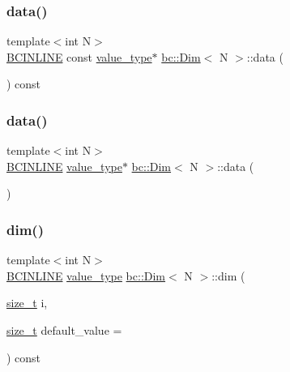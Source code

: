 \subsubsection{\texorpdfstring{data()}{data()}\hspace{0.1cm}{\footnotesize\ttfamily [1/2]}}
{\footnotesize\ttfamily template$<$int N$>$ \\
\hyperlink{common_8h_a6699e8b0449da5c0fafb878e59c1d4b1}{B\+C\+I\+N\+L\+I\+NE} const \hyperlink{structbc_1_1Dim_af59ff554825273cf6bd9619b2c78c196}{value\+\_\+type}$\ast$ \hyperlink{structbc_1_1Dim}{bc\+::\+Dim}$<$ N $>$\+::data (\begin{DoxyParamCaption}{ }\end{DoxyParamCaption}) const\hspace{0.3cm}{\ttfamily [inline]}}

\mbox{\label{structbc_1_1Dim_a45d1cefd214716eb389287d89209e584}} 
\subsubsection{\texorpdfstring{data()}{data()}\hspace{0.1cm}{\footnotesize\ttfamily [2/2]}}
{\footnotesize\ttfamily template$<$int N$>$ \\
\hyperlink{common_8h_a6699e8b0449da5c0fafb878e59c1d4b1}{B\+C\+I\+N\+L\+I\+NE} \hyperlink{structbc_1_1Dim_af59ff554825273cf6bd9619b2c78c196}{value\+\_\+type}$\ast$ \hyperlink{structbc_1_1Dim}{bc\+::\+Dim}$<$ N $>$\+::data (\begin{DoxyParamCaption}{ }\end{DoxyParamCaption})\hspace{0.3cm}{\ttfamily [inline]}}

\mbox{\label{structbc_1_1Dim_adccb44583ec5a299e67b3f780dda7efc}} 
\subsubsection{\texorpdfstring{dim()}{dim()}}
{\footnotesize\ttfamily template$<$int N$>$ \\
\hyperlink{common_8h_a6699e8b0449da5c0fafb878e59c1d4b1}{B\+C\+I\+N\+L\+I\+NE} \hyperlink{structbc_1_1Dim_af59ff554825273cf6bd9619b2c78c196}{value\+\_\+type} \hyperlink{structbc_1_1Dim}{bc\+::\+Dim}$<$ N $>$\+::dim (\begin{DoxyParamCaption}\item[{\hyperlink{structbc_1_1Dim_a8c7c7ae0cd96c3923e76097089747290}{size\+\_\+t}}]{i,  }\item[{\hyperlink{structbc_1_1Dim_a8c7c7ae0cd96c3923e76097089747290}{size\+\_\+t}}]{default\+\_\+value = {} }\end{DoxyParamCaption}) const\hspace{0.3cm}{\ttfamily [inline]}}

